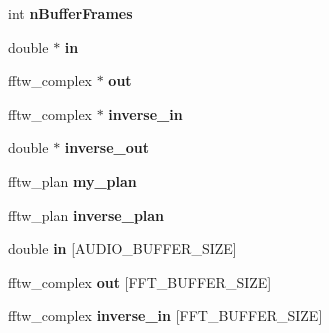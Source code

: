 \begin{DoxyCompactItemize}
\item 
\hypertarget{classfft_ab960a894180e634d2eace4b68700dff3}{int {\bfseries n\-Buffer\-Frames}}\label{classfft_ab960a894180e634d2eace4b68700dff3}

\item 
\hypertarget{classfft_ad52a575c3cf3f7aae014927bcc4cbbe2}{double $\ast$ {\bfseries in}}\label{classfft_ad52a575c3cf3f7aae014927bcc4cbbe2}

\item 
\hypertarget{classfft_a21e2e595b77d7f003ec24075eb892fe1}{fftw\-\_\-complex $\ast$ {\bfseries out}}\label{classfft_a21e2e595b77d7f003ec24075eb892fe1}

\item 
\hypertarget{classfft_a30b05b794baa0c8965b7e4cc63bafd98}{fftw\-\_\-complex $\ast$ {\bfseries inverse\-\_\-in}}\label{classfft_a30b05b794baa0c8965b7e4cc63bafd98}

\item 
\hypertarget{classfft_a162e76aaf4e73ff332cd71f81556fbcc}{double $\ast$ {\bfseries inverse\-\_\-out}}\label{classfft_a162e76aaf4e73ff332cd71f81556fbcc}

\item 
\hypertarget{classfft_a2845f6a00618246fc6adfb57ae106925}{fftw\-\_\-plan {\bfseries my\-\_\-plan}}\label{classfft_a2845f6a00618246fc6adfb57ae106925}

\item 
\hypertarget{classfft_a8b7b6b88eb0b9aaf7ae7580e5b42a533}{fftw\-\_\-plan {\bfseries inverse\-\_\-plan}}\label{classfft_a8b7b6b88eb0b9aaf7ae7580e5b42a533}

\item 
\hypertarget{classfft_ad7bd6dde9d599f62bd764ad986ac4305}{double {\bfseries in} \mbox{[}A\-U\-D\-I\-O\-\_\-\-B\-U\-F\-F\-E\-R\-\_\-\-S\-I\-Z\-E\mbox{]}}\label{classfft_ad7bd6dde9d599f62bd764ad986ac4305}

\item 
\hypertarget{classfft_a6c30ac336ab818e27c0a819ad942a6f3}{fftw\-\_\-complex {\bfseries out} \mbox{[}F\-F\-T\-\_\-\-B\-U\-F\-F\-E\-R\-\_\-\-S\-I\-Z\-E\mbox{]}}\label{classfft_a6c30ac336ab818e27c0a819ad942a6f3}

\item 
\hypertarget{classfft_adc3213de8e941a184c2ec3a1ca31815a}{fftw\-\_\-complex {\bfseries inverse\-\_\-in} \mbox{[}F\-F\-T\-\_\-\-B\-U\-F\-F\-E\-R\-\_\-\-S\-I\-Z\-E\mbox{]}}\label{classfft_adc3213de8e941a184c2ec3a1ca31815a}


\end{DoxyCompactItemize}
